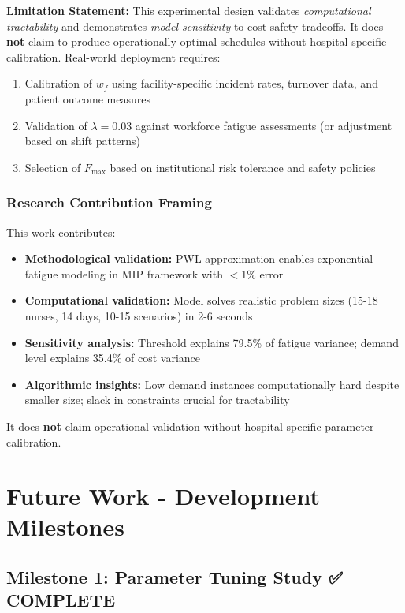 \documentclass[11pt,letterpaper]{article}
\begin{document}
\textbf{Limitation Statement:} This experimental design validates \emph{computational tractability} and demonstrates \emph{model sensitivity} to cost-safety tradeoffs. It does \textbf{not} claim to produce operationally optimal schedules without hospital-specific calibration. Real-world deployment requires:
\begin{enumerate}[leftmargin=*]
    \item Calibration of $w_f$ using facility-specific incident rates, turnover data, and patient outcome measures
    \item Validation of $\lambda=0.03$ against workforce fatigue assessments (or adjustment based on shift patterns)
    \item Selection of $F_{\max}$ based on institutional risk tolerance and safety policies
\end{enumerate}

\subsubsection{Research Contribution Framing}
This work contributes:
\begin{itemize}[leftmargin=*]
    \item \textbf{Methodological validation:} PWL approximation enables exponential fatigue modeling in MIP framework with $<$1\% error
    \item \textbf{Computational validation:} Model solves realistic problem sizes (15-18 nurses, 14 days, 10-15 scenarios) in 2-6 seconds
    \item \textbf{Sensitivity analysis:} Threshold explains 79.5\% of fatigue variance; demand level explains 35.4\% of cost variance
    \item \textbf{Algorithmic insights:} Low demand instances computationally hard despite smaller size; slack in constraints crucial for tractability
\end{itemize}

It does \textbf{not} claim operational validation without hospital-specific parameter calibration.

\section{Future Work - Development Milestones}

\subsection{Milestone 1: Parameter Tuning Study ✅ COMPLETE}
\end{document}
